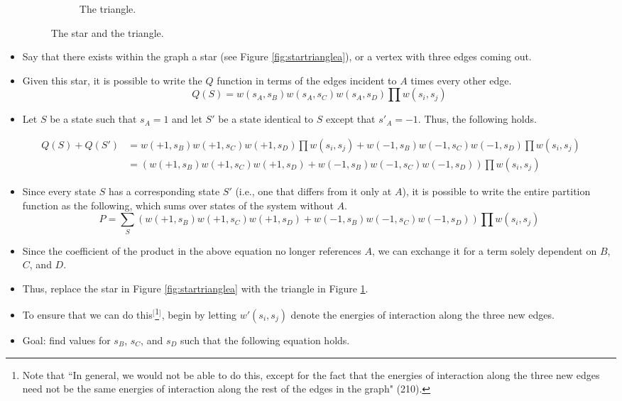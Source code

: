 \documentclass[titlepage]{article}
\numberwithin{figure}{section}
\numberwithin{table}{section}
\numberwithin{equation}{section}
\newcommand{\dq}[2]{``#1" (#2).}
\begin{document}
\begin{itemize}
\begin{figure}[h!]
\begin{subfigure}[b]{0.2\linewidth}
            \caption{The triangle.}
            \label{fig:startriangleb}
        \end{subfigure}
        \caption{The star and the triangle.}
        \label{fig:startriangle}
    \end{figure}
    \item Say that there exists within the graph a star (see Figure \ref{fig:startrianglea}), or a vertex with three edges coming out.
    \item Given this star, it is possible to write the $Q$ function in terms of the edges incident to $A$ times every other edge.
    \begin{equation*}
        Q(S) = w(s_A,s_B)w(s_A,s_C)w(s_A,s_D)\prod w(s_i,s_j)
    \end{equation*}
    \item Let $S$ be a state such that $s_A=1$ and let $S'$ be a state identical to $S$ except that $s'_A=-1$. Thus, the following holds.
\end{itemize}
\begin{align*}
    Q(S)+Q(S') &= w(+1,s_B)w(+1,s_C)w(+1,s_D)\prod w(s_i,s_j) + w(-1,s_B)w(-1,s_C)w(-1,s_D)\prod w(s_i,s_j)\\
    &= \left( w(+1,s_B)w(+1,s_C)w(+1,s_D) + w(-1,s_B)w(-1,s_C)w(-1,s_D) \right)\prod w(s_i,s_j)
\end{align*}
\begin{itemize}
    \item Since every state $S$ has a corresponding state $S'$ (i.e., one that differs from it only at $A$), it is possible to write the entire partition function as the following, which sums over states of the system without $A$.
    \begin{equation*}
        P = \sum_S \left( w(+1,s_B)w(+1,s_C)w(+1,s_D) + w(-1,s_B)w(-1,s_C)w(-1,s_D) \right)\prod w(s_i,s_j)
    \end{equation*}
    \item Since the coefficient of the product in the above equation no longer references $A$, we can exchange it for a term solely dependent on $B$, $C$, and $D$.
    \item Thus, replace the star in Figure \ref{fig:startrianglea} with the triangle in Figure \ref{fig:startriangleb}.
    \item To ensure that we can do this$^[$\footnote{Note that \dq{In general, we would not be able to do this, except for the fact that the energies of interaction along the three new edges need not be the same energies of interaction along the rest of the edges in the graph}{210}}$^]$, begin by letting $w'(s_i,s_j)$ denote the energies of interaction along the three new edges.
    \item Goal: find values for $s_B$, $s_C$, and $s_D$ such that the following equation holds.
\end{itemize}
\end{document}
